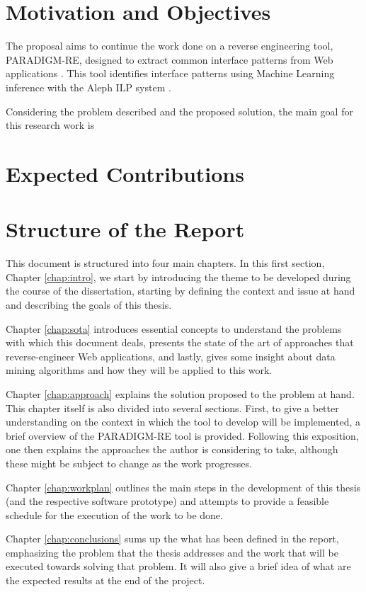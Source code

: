 \section{Motivation and Objectives} \label{sec:goals}
The proposal aims to continue the work done on a reverse engineering tool, PARADIGM-RE, designed to extract common interface patterns from Web applications \cite{nabuco2013inferring}. This tool identifies interface patterns using Machine Learning inference with the Aleph ILP system \cite{aleph}.

Considering the problem described and the proposed solution, the main goal for this research work is

\section{Expected Contributions} \label{sec:project}


\section{Structure of the Report} \label{sec:outline}

This document is structured into four main chapters. In this first section, Chapter \ref{chap:intro}, we start by introducing the theme to be developed during the course of the dissertation, starting by defining the context and issue at hand and describing the goals of this thesis.

Chapter \ref{chap:sota} introduces essential concepts to understand the problems with which this document deals, presents the state of the art of approaches that reverse-engineer Web applications, and lastly, gives some insight about data mining algorithms and how they will be applied to this work.

Chapter \ref{chap:approach} explains the solution proposed to the problem at hand. This chapter itself is also divided into several sections. First, to give a better understanding on the context in which the tool to develop will be implemented, a brief overview of the PARADIGM-RE tool is provided. Following this exposition, one then explains the approaches the author is considering to take, although these might be subject to change as the work progresses.

Chapter \ref{chap:workplan} outlines the main steps in the development of this thesis (and the respective software prototype) and attempts to provide a feasible schedule for the execution of the work to be done.

Chapter \ref{chap:conclusions} sums up the what has been defined in the report, emphasizing the problem that the thesis addresses and the work that will be executed towards solving that problem. It will also give a brief idea of what are the expected results at the end of the project.